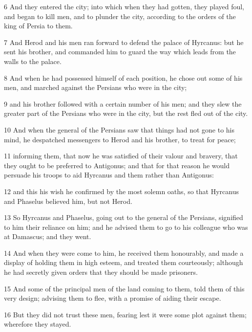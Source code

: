\par 6 And they entered the city; into which when they had gotten, they played foul, and began to kill men, and to plunder the city, according to the orders of the king of Persia to them. 

\par 7 And Herod and his men ran forward to defend the palace of Hyrcanus: but he sent his brother, and commanded him to guard the way which leads from the walls to the palace. 

\par 8 And when he had possessed himself of each position, he chose out some of his men, and marched against the Persians who were in the city; 

\par 9 and his brother followed with a certain number of his men; and they slew the greater part of the Persians who were in the city, but the rest fled out of the city. 

\par 10 And when the general of the Persians saw that things had not gone to his mind, he despatched messengers to Herod and his brother, to treat for peace; 

\par 11 informing them, that now he was satisfied of their valour and bravery, that they ought to be preferred to Antigonus; and that for that reason he would persuade his troops to aid Hyrcanus and them rather than Antigonus: 

\par 12 and this his wish he confirmed by the most solemn oaths, so that Hyrcanus and Phaselus believed him, but not Herod. 

\par 13 So Hyrcanus and Phaselus, going out to the general of the Persians, signified to him their reliance on him; and he advised them to go to his colleague who was at Damascus; and they went. 

\par 14 And when they were come to him, he received them honourably, and made a display of holding them in high esteem, and treated them courteously; although he had secretly given orders that they should be made prisoners. 

\par 15 And some of the principal men of the land coming to them, told them of this very design; advising them to flee, with a promise of aiding their escape. 

\par 16 But they did not trust these men, fearing lest it were some plot against them; wherefore they stayed. 

